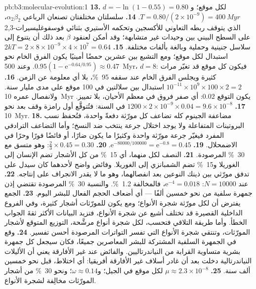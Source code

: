 \begin{solution}{pb:b3:molecular-evolution:1}
\textbf{13.} $d = -\ln(1 - 0.55) = 0.80$ لكل موقع؛ و$T = 0.80/(2\times
10^{-9}) = \qty{400}{Myr}$.
\textbf{14.} سلسلتان مختلفتان تصنعان الرباعي $\alpha_{2}\beta_{2}$،
الذي يتوقف ربطه التعاوني للأكسجين  وتحكمه الأستيري
بثنائي فوسفوغليسيرات-2,3 على السطح البيني بين وحيدات غير
متشابهة؛ وقد أمكن لعنقود $\beta$ بعد ذلك أن يتنوع إلى سلاسل
جنينية وحملية وبالغة بألفات مختلفة.
\textbf{15.} $2kT = 2\times 8\times 10^{-9}\times 4\times 10^{7} = 0.64$
استبدال لكل موقع؛ ومع التشبع بين عشرين حمضًا أمينيًا يكون
الفرق الخام نحو $0.95(1 - \mathrm{e}^{-0.64/0.95}) \approx 0.47$.
وعند \qty{500}{Myr}، $d = 8$: فيكون كل موقع قد تغيّر مرات كثيرة ويجلس
الفرق الخام عند سقفه \qty{95}{\%}، بلا أي
معلومة عن الزمن.
\textbf{16.} $10^{-11}\times 10^{9}\times 100\times 2 = 2$ استبدال
بين سلالتين في 100 موقع على مدى مليار سنة. ولانفصال عمره
\qty{10}{Myr} يكون التوقع $0.02$: أي صفر فروق في معظم الأحيان، بلا تمييز.
\textbf{17.} $1200\times 2\times 10^{-9}\times 0.04 = 9.6\times 10^{-8}$
في السنة: فتُتوقَّع أول رامزة وقف بعد نحو \qty{10}{Myr}.
\textbf{18.} مضاعفة الجينوم كله تضاعف كل مورّثة دفعةً واحدة،
فتُحفظ نسب البروتينات المتفاعلة ولا يوجد اختلال جرعة ينتخب
ضد النسخ؛ وأما التضاعف الترادفي المفرد فيغيّر جرعة مورّثة
واحدة وكثيرًا ما يكون ضارًا، أو فائضًا فورًا وحرًا في الاضمحلال.
\textbf{19.} $\mathrm{e}^{-\num{80000}/\num{100000}} = \mathrm{e}^{-0.8} = 0.45$.
\textbf{20.} $\tfrac{2}{3}\times 0.45 = 0.30$: وهو متسق مع
\qty{30}{\%} المرصودة.
\textbf{21.} النصف لكل منهما، أي \qty{15}{\%} من كل الأشجار تضم
الإنسان إلى الغوريلا و\qty{15}{\%} تضم الشمبانزي إلى الغوريلا.
وفائض واضح لأحدهما كان سيدل على تدفق مورّثي بين ذينك النوعين
بعد انفصالهما، وهو ما لا يقدر الانجراف على إنتاجه.
\textbf{22.} عند $N = \num{10000}$: $\mathrm{e}^{-4} = 0.018$، فالمخالفة
\qty{1.2}{\%}. والنسبة \qty{30}{\%} المرصودة تقتضي إذن جمهرة
سلفية من نحو خمسين ألفًا --- أي أضعاف الحجم الفعال
للبشر اليوم.
\textbf{23.} الجمع يفترض أن لكل مورّثة شجرة الأنواع؛ ومع
 يكون للمورّثات أشجار كثيرة، وفي
الفروع الداخلية القصيرة قد تختلف أشيع  عن شجرة
الأنواع، فتزيد البيانات الأكثر ثقةَ الجواب الخطأ. وأما طريقة
التلاقي فتحسب، لكل شجرة أنواع مرشَّحة، التوزيع المتوقع لأشجار
المورّثات، وتنتقي شجرة الأنواع التي تفسر التواترات المرصودة
أحسن تفسير.
\textbf{24.}  وقع في الجمهرة السلفية
المشتركة للبشر المعاصرين جميعًا، فكان سيجعل كل جمهرة بشرية
متساوية القرابة من النياندرتاليين. والفائض عند غير الأفارقة
يعني أن الأليلات النياندرتالية دخلت بعد أن غادر أسلاف غير
الأفارقة أفريقيا: أي اختلاط، قبل نحو خمسين ألف سنة.
\textbf{25.} $\mu \approx 2.3\times 10^{-8}$ لكل موقع في الجيل؛
و$\omega \approx 0.14$؛ ونحو \qty{30}{\%} من أشجار المورّثات
مخالِفة لشجرة الأنواع.
\end{solution}
